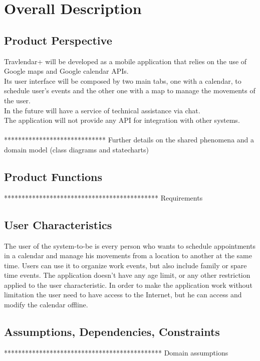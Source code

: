 %
%
\chapter{Overall Description}
%
\label{cap:overalldescription}
%
%
\section{Product Perspective}
Travlendar+ will be developed as a mobile application that relies on the use of Google maps and Google calendar APIs. \\
Its user interface will be composed by two main tabs, one with a calendar, to schedule user's events and the other one with a map to manage the movements of the user. \\
In the future will have a service of technical assistance via chat. \\
The application will not provide any API for integration with other systems.
\\
\\
***************************** Further details on the shared phenomena and a domain model (class diagrams and statecharts)
%
%
\section{Product Functions}
******************************************** Requirements
%
%
\section{User Characteristics}
The user of the system-to-be is every person who wants to schedule appointments in a calendar and manage his movements from a location to another at the same time.
Users can use it to organize work events, but also include family or spare time events. The application doesn't have any age limit, or any other restriction applied to the user characteristic. In order to make the application work without limitation the user need to have access to the Internet, but he can access and modify the calendar offline.
%
%
\section{Assumptions, Dependencies, Constraints}
********************************************* Domain assumptions
%
